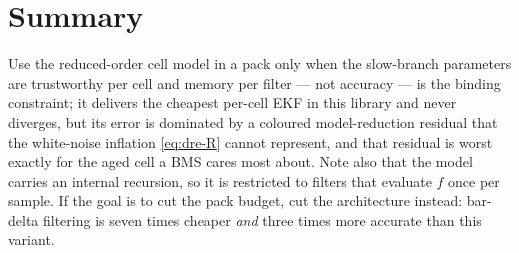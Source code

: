 \section{Summary}
Use the reduced-order cell model in a pack only when the slow-branch parameters are trustworthy
per cell and memory per filter --- not accuracy --- is the binding constraint; it delivers the
cheapest per-cell EKF in this library and never diverges, but its error is dominated by a coloured
model-reduction residual that the white-noise inflation \eqref{eq:dre-R} cannot represent, and that
residual is worst exactly for the aged cell a BMS cares most about. Note also that the model
carries an internal recursion, so it is restricted to filters that evaluate $f$ once per sample.
If the goal is to cut the pack budget, cut the architecture instead: bar-delta filtering is seven
times cheaper \emph{and} three times more accurate than this variant.

